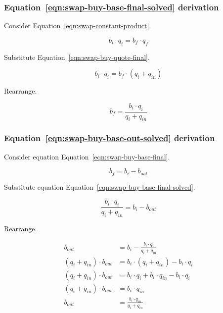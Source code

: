 \documentclass[table, twocolumn]{article}
\begin{document}
\subsubsection{Equation~\ref{eqn:swap-buy-base-final-solved} derivation}%
\label{sssec:equation-eqn-swap-buy-base-final-solved-derivation}

Consider Equation~\ref{eqn:swap-constant-product}.

\begin{equation}
	b_i \cdot q_i = b_f \cdot q_f \nonumber
\end{equation}

Substitute Equation~\ref{eqn:swap-buy-quote-final}.

\begin{equation}
  b_i \cdot q_i = b_f \cdot (q_i + q_{in}) \nonumber
\end{equation}

Rearrange.

\begin{equation}
  b_f = \frac{b_i \cdot q_i}{q_i + q_{in}} \nonumber
\end{equation}

\subsubsection{Equation~\ref{eqn:swap-buy-base-out-solved} derivation}%
\label{sssec:equation-eqn-swap-buy-base-out-solved-derivation}

Consider equation Equation~\ref{eqn:swap-buy-base-final}.

\begin{equation}
  b_f = b_i - b_{out} \nonumber
\end{equation}

Substitute equation Equation~\ref{eqn:swap-buy-base-final-solved}.

\begin{equation}
  \frac{b_i \cdot q_i}{q_i + q_{in}} = b_i - b_{out} \nonumber
\end{equation}

Rearrange.

\begin{align}
  b_{out} &= b_i - \frac{b_i \cdot q_i}{q_i + q_{in}} \nonumber \\
  (q_i + q_{in}) \cdot b_{out} &= b_i \cdot (q_i + q_{in})- b_i \cdot q_i \nonumber \\
  (q_i + q_{in}) \cdot b_{out} &=
  b_i \cdot q_i + b_i \cdot q_{in} - b_i \cdot q_i \nonumber \\
  (q_i + q_{in}) \cdot b_{out} &= b_i \cdot q_{in} \nonumber \\
  b_{out} &= \frac{b_i \cdot q_{in}}{q_i + q_{in}} \nonumber
\end{align}
\end{document}
